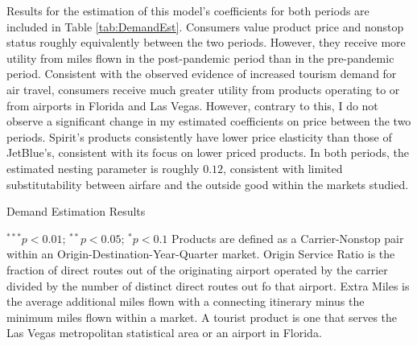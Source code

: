 \documentclass{article}
\begin{document}
    Results for the estimation of this model's coefficients for both periods are included in Table \ref{tab:DemandEst}. Consumers value product price and nonstop status roughly equivalently between the two periods. However, they receive more utility from miles flown in the post-pandemic period than in the pre-pandemic period. Consistent with the observed evidence of increased tourism demand for air travel, consumers receive much greater utility from products operating to or from airports in Florida and Las Vegas. However, contrary to this, I do not observe a significant change in my estimated coefficients on price between the two periods. Spirit's products consistently have lower price elasticity than those of JetBlue's, consistent with its focus on lower priced products. In both periods, the estimated nesting parameter is roughly $0.12$, consistent with limited substitutability between airfare and the outside good within the markets studied.

    \begin{table}
        \caption{Demand Estimation Results}
        \label{tab:DemandEst}
        \vspace{-15mm}
        \begin{center}
        
                \footnotesize{$^{***}p<0.01$; $^{**}p<0.05$; $^{*}p<0.1$ Products are defined as a Carrier-Nonstop pair within an Origin-Destination-Year-Quarter market. Origin Service Ratio is the fraction of direct routes out of the originating airport operated by the carrier divided by the number of distinct direct routes out fo that airport. Extra Miles is the average additional miles flown with a connecting itinerary minus the minimum miles flown within a market.  A tourist product is one that serves the Las Vegas metropolitan statistical area or an airport in Florida.}

        \end{center}
    \end{table}
	
	
\end{document}
